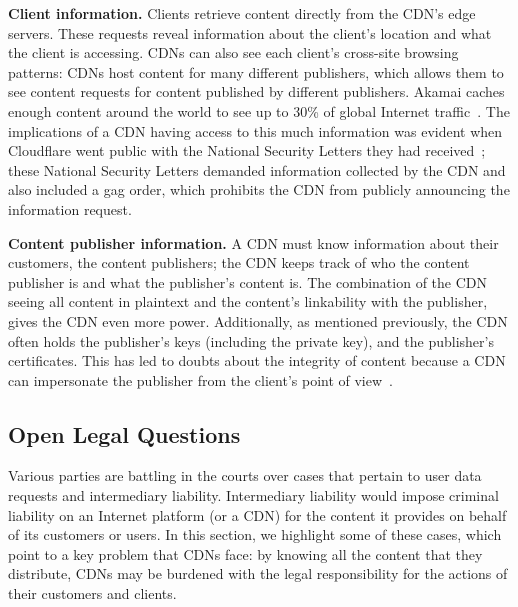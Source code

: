 \textbf{Client information.} Clients retrieve content directly from the
CDN's edge servers. These requests reveal
information about the client's location and what the client is accessing.  
CDNs can also see each client's cross-site browsing patterns: CDNs host content
for
many different publishers, which allows 
them to see content requests for content published by different publishers.  Akamai caches enough content around the world to see up to 30\% of global Internet 
traffic~\cite{akamai_global_traffic}.  The implications of a CDN having access to
this much information was evident when Cloudflare
went public with the National Security Letters they had received~\cite{cloudflare_nsl};
these National Security Letters
demanded information collected by the CDN and also included a gag order, which prohibits
the CDN from publicly announcing the information request.  

\textbf{Content publisher information.} A CDN must know information
about their customers, the content
publishers; the CDN keeps track of who the content publisher is and 
what the publisher's content is.  The combination of the CDN seeing all content in plaintext and the content's 
linkability with the publisher, gives the CDN even more power.  Additionally, as mentioned previously, the CDN often 
holds the publisher's keys (including the private key), and the publisher's certificates.  This has led to doubts 
about the integrity of content because a CDN can impersonate the publisher from the client's point of view~\cite{levy2015stickler}.

\subsection{Open Legal Questions}

Various parties are battling in the courts over cases that pertain to user data requests and intermediary liability.  Intermediary liability would impose criminal liability on an Internet platform (or a CDN) for the content it provides on behalf of its customers or users. In this section, we highlight some of these cases, which point to a key problem that CDNs face: by knowing all the content that they distribute, CDNs may be burdened with the legal responsibility for the actions of their customers and clients.

